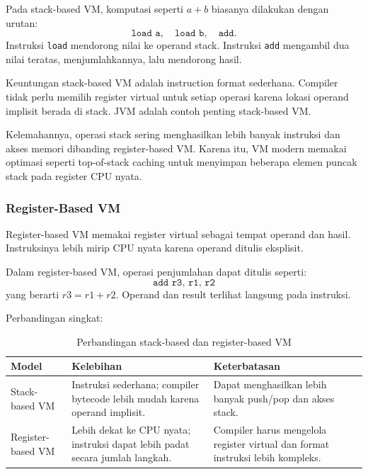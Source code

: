 Pada stack-based VM, komputasi seperti $a+b$ biasanya dilakukan dengan urutan:
\[
    \texttt{load a},\quad \texttt{load b},\quad \texttt{add}.
\]
Instruksi \texttt{load} mendorong nilai ke operand stack. Instruksi \texttt{add} mengambil dua nilai teratas, menjumlahkannya, lalu mendorong hasil.

Keuntungan stack-based VM adalah instruction format sederhana. Compiler tidak perlu memilih register virtual untuk setiap operasi karena lokasi operand implisit berada di stack. JVM adalah contoh penting stack-based VM.

Kelemahannya, operasi stack sering menghasilkan lebih banyak instruksi dan akses memori dibanding register-based VM. Karena itu, VM modern memakai optimasi seperti top-of-stack caching untuk menyimpan beberapa elemen puncak stack pada register CPU nyata.

\subsubsection{Register-Based VM}

\begin{jawab}
Register-based VM memakai register virtual sebagai tempat operand dan hasil. Instruksinya lebih mirip CPU nyata karena operand ditulis eksplisit.
\end{jawab}

Dalam register-based VM, operasi penjumlahan dapat ditulis seperti:
\[
    \texttt{add r3, r1, r2}
\]
yang berarti $r3=r1+r2$. Operand dan result terlihat langsung pada instruksi.

Perbandingan singkat:

\begin{table}[H]
\centering
\begin{tabularx}{\textwidth}{|L{0.24\textwidth}|X|X|}
\hline
\textbf{Model} & \textbf{Kelebihan} & \textbf{Keterbatasan} \\
\hline
Stack-based VM & Instruksi sederhana; compiler bytecode lebih mudah karena operand implisit. & Dapat menghasilkan lebih banyak push/pop dan akses stack. \\
\hline
Register-based VM & Lebih dekat ke CPU nyata; instruksi dapat lebih padat secara jumlah langkah. & Compiler harus mengelola register virtual dan format instruksi lebih kompleks. \\
\hline
\end{tabularx}
\caption{Perbandingan stack-based dan register-based VM}
\label{tab:stack-register-vm}
\end{table}

